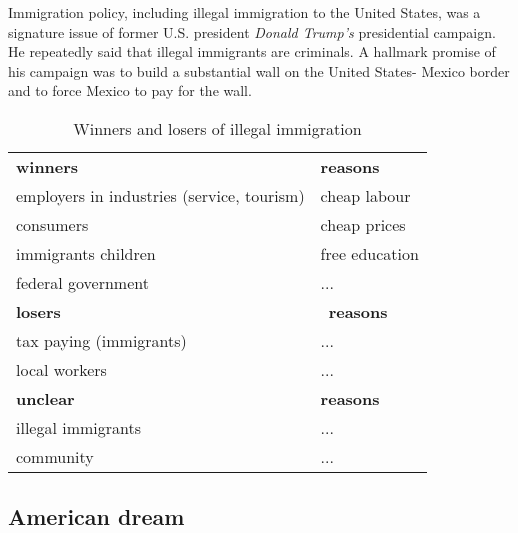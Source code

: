 \documentclass[10pt]{article}
\begin{document}
Immigration policy, including illegal immigration to the United States, was a signature issue of former
U.S. president \emph{Donald Trump's} presidential campaign. He repeatedly said that illegal immigrants are
criminals. A hallmark promise of his campaign was to build a substantial wall on the United States-
Mexico border and to force Mexico to pay for the wall.

\begin{table}[htbp]
	\centering
	\begin{tabularx}{\textwidth}{l|l}
		\hline
		{\sffamily\bfseries winners} & {\sffamily\bfseries reasons}\\
		employers in industries (service, tourism) & cheap labour \\
		consumers & cheap prices \\
		immigrants children & free education \\
		federal government & ... \\ \hline
		{\sffamily\bfseries losers} & \ {\sffamily\bfseries reasons}\\
		tax paying (immigrants) & ... \\
		local workers & ... \\ \hline
		{\sffamily\bfseries unclear} & {\sffamily\bfseries reasons}\\
		illegal immigrants & ... \\
		community & ... \\ \hline
	\end{tabularx}
	\caption{Winners and losers of illegal immigration}
	\label{tab:my_label}
\end{table}

\subsection{American dream}
	\label{ssec:usa@dream}
\end{document}
